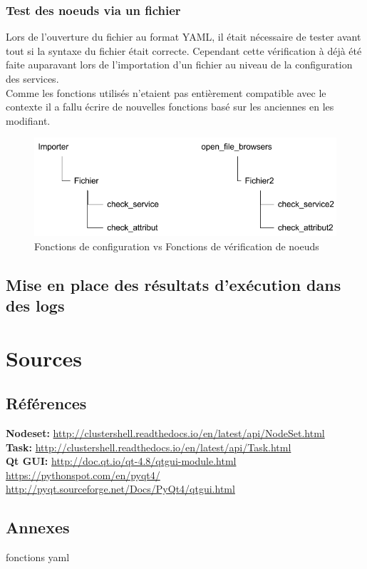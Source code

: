 \documentclass[a4paper,11pt]{article}
\begin{document}
\subsubsection{Test des noeuds via un fichier}
Lors de l'ouverture du fichier au format YAML, il était nécessaire de tester avant tout si la syntaxe du fichier était correcte. Cependant cette vérification à déjà été faite auparavant lors de l'importation d'un fichier au niveau de la configuration des services.\\
Comme les fonctions utilisés n'etaient pas entièrement compatible avec le contexte il a fallu écrire de nouvelles fonctions basé sur les anciennes en les modifiant.\\
\begin{figure}[hbtp]
\centering
\includegraphics[scale=0.5]{difference_importer_openfile.png}
\caption{Fonctions de configuration vs Fonctions de vérification de noeuds}
\end{figure}



\subsection{Mise en place des résultats d'exécution dans des logs}
\section{Sources}
\label{sec:section6}
\subsection{Références}
\noindent\textbf{Nodeset:} \url{http://clustershell.readthedocs.io/en/latest/api/NodeSet.html}\\
\textbf{Task:} \url{http://clustershell.readthedocs.io/en/latest/api/Task.html}\\
\textbf{Qt GUI:} \url {http://doc.qt.io/qt-4.8/qtgui-module.html}\\
\url {https://pythonspot.com/en/pyqt4/}\\
\url {http://pyqt.sourceforge.net/Docs/PyQt4/qtgui.html} 

\subsection{Annexes}

fonctions yaml
\end{document}
